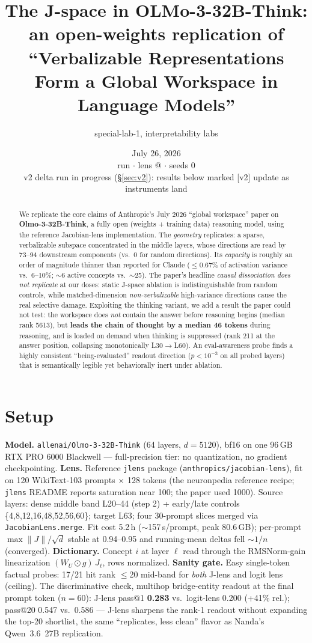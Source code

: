 \documentclass[10pt]{article}
\title{\bfseries The J-space in OLMo-3-32B-Think:\\
\large an open-weights replication of ``Verbalizable Representations Form a
Global Workspace in Language Models''}
\author{special-lab-1, interpretability labs%
}
\date{July 26, 2026 \\[2pt] \small run \code{2026-07-25\_1726} \;\(\cdot\)\;
lens \jlens{} @ \code{581d3986} \;\(\cdot\)\; seeds 0 \\[2pt]
\small\color{gray!60!black} v2 delta run in progress (\S\ref{sec:v2}):
results below marked [v2] update as instruments land}
\newcommand{\jlens}{\texttt{jlens}}
\newcommand{\code}[1]{\texttt{#1}}
\begin{document}
\maketitle

\begin{abstract}
\noindent
We replicate the core claims of Anthropic's July 2026 ``global workspace''
paper on \textbf{Olmo-3-32B-Think}, a fully open (weights + training data)
reasoning model, using the reference Jacobian-lens implementation. The
\emph{geometry} replicates: a sparse, verbalizable subspace concentrated in
the middle layers, whose directions are read by 73--94 downstream components
(vs.\ 0 for random directions). Its \emph{capacity} is roughly an order of
magnitude thinner than reported for Claude ($\le$0.67\% of activation
variance vs.\ 6--10\%; $\sim$6 active concepts vs.\ $\sim$25). The paper's
headline \emph{causal dissociation does not replicate} at our doses: static
J-space ablation is indistinguishable from random controls, while
matched-dimension \emph{non-verbalizable} high-variance directions cause the
real selective damage. Exploiting the thinking variant, we add a result the
paper could not test: the workspace does \emph{not} contain the answer before
reasoning begins (median rank 5613), but \textbf{leads the chain of thought by
a median 46 tokens} during reasoning, and is loaded on demand when thinking is
suppressed (rank 211 at the answer position, collapsing monotonically
L30$\to$L60). An eval-awareness probe finds a highly consistent
``being-evaluated'' readout direction ($p<10^{-3}$ on all probed layers) that
is semantically legible yet behaviorally inert under ablation.
\end{abstract}

\section{Setup}

\textbf{Model.} \code{allenai/Olmo-3-32B-Think} (64 layers, $d=5120$), bf16 on
one 96\,GB RTX PRO 6000 Blackwell --- full-precision tier: no quantization, no
gradient checkpointing.
\textbf{Lens.} Reference \jlens{} package (\code{anthropics/jacobian-lens}),
fit on 120 WikiText-103 prompts $\times$ 128 tokens (the neuronpedia reference
recipe; \jlens{} README reports saturation near 100; the paper used 1000).
Source layers: dense middle band L20--44 (step 2) + early/late controls
\{4,8,12,16,48,52,56,60\}; target L63; four 30-prompt slices merged via
\code{JacobianLens.merge}. Fit cost 5.2\,h ($\sim$157\,s/prompt, peak
80.6\,GB); per-prompt $\max\|J\|/\sqrt{d}$ stable at 0.94--0.95 and
running-mean deltas fell $\sim 1/n$ (converged).
\textbf{Dictionary.} Concept $i$ at layer $\ell$ read through the
RMSNorm-gain linearization $(W_U \odot g)\,J_\ell$, rows normalized.
\textbf{Sanity gate.} Easy single-token factual probes: 17/21 hit rank
$\le$20 mid-band for \emph{both} J-lens and logit lens (ceiling). The
discriminative check, multihop bridge-entity readout at the final prompt token
($n=60$): J-lens pass@1 \textbf{0.283} vs.\ logit-lens 0.200 (+41\% rel.);
pass@20 0.547 vs.\ 0.586 --- J-lens sharpens the rank-1 readout without
expanding the top-20 shortlist, the same ``replicates, less clean'' flavor as
Nanda's Qwen~3.6~27B replication.
\end{document}
